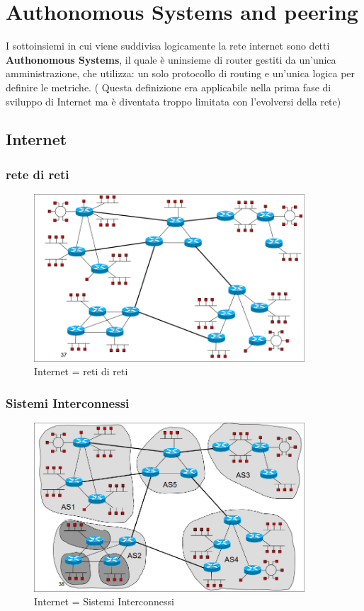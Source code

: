 \documentclass{report}
\begin{document}
    \chapter{Authonomous Systems and peering}
        I sottoinsiemi in cui viene suddivisa logicamente la rete internet sono detti \textbf{Authonomous Systems}, il quale è uninsieme di router gestiti da un'unica amministrazione, che utilizza: un solo protocollo di routing e un'unica logica per definire le metriche. ( Questa definizione era applicabile nella prima fase di sviluppo di Internet ma è diventata troppo limitata con l’evolversi della rete)
        \section{Internet}
            \subsection{rete di reti}
                \begin{figure}[H]
                    \includegraphics[width=0.9\textwidth]{3/rDr.png}
                    \caption{Internet = reti di reti}
                \end{figure}
            \subsection{Sistemi Interconnessi} 
                \begin{figure}[H]
                    \includegraphics[width=0.9\textwidth]{3/sisInt.png}
                    \caption{Internet = Sistemi Interconnessi}
                \end{figure}
\end{document}

